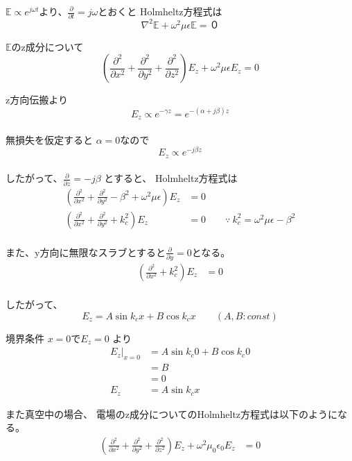 \documentclass[a4paper,10pt]{bxjsarticle}
\begin{document}
$\mathbb{E} \propto e^{j\omega t}$より、$\frac{\partial}{\partial t} = j\omega$とおくと
Holmheltz方程式は
$$
\nabla^2 \mathbb{E} + \omega^2 \mu \epsilon \mathbb{E} = ０
$$

$\mathbb{E}$のz成分について
$$
\left( 
    \frac{\partial^2}{\partial x^2} 
    + \frac{\partial^2}{\partial y^2} 
    + \frac{\partial^2}{\partial z^2} 
\right) E_z
+ \omega^2 \mu \epsilon E_z
= 0
$$

z方向伝搬より $$E_z \propto e^{-\gamma z} = e^{-(\alpha + j \beta)z}$$ \\
無損失を仮定すると $\alpha = 0$なので $$E_z \propto e^{ -j \beta z}$$ \\
したがって、$ \frac{\partial}{\partial z} = -j \beta $ とすると、
Holmheltz方程式は
\begin{align*} 
\left( 
    \frac{\partial^2}{\partial x^2} 
    + \frac{\partial^2}{\partial y^2} 
    - \beta^2 
    + \omega^2 \mu \epsilon
\right) E_z
&= 0 \\
\left( 
    \frac{\partial^2}{\partial x^2} 
    + \frac{\partial^2}{\partial y^2} 
    + k_c^2
\right) E_z
&= 0 \qquad
\because \ k_c^2 = \omega^2 \mu \epsilon - \beta^2 \\
\end{align*}

また、y方向に無限なスラブとすると$\frac{\partial}{\partial y} = 0$となる。
\begin{align*} 
    \left( 
        \frac{\partial^2}{\partial x^2} + k_c^2
    \right) E_z
    &= 0 \\
\end{align*}

したがって、
$$ E_z = A \sin k_c x + B \cos k_c x \qquad (A,B : const) $$

境界条件 $x = 0$で$E_z = 0$ より
\begin{align*}
    E_z|_{x=0} &= A \sin k_c 0 + B \cos k_c 0 \\
             &= B \\ 
             &= 0 \\
    E_z &= A \sin k_c x
\end{align*}

また真空中の場合、
電場のz成分についてのHolmheltz方程式は以下のようになる。
\begin{align*}
    \left( 
        \frac{\partial^2}{\partial x^2} 
        + \frac{\partial^2}{\partial y^2} 
        + \frac{\partial^2}{\partial z^2} 
    \right) E_z
    + \omega^2 \mu_0 \epsilon_0 E_z
    & = 0
\end{align*}
\end{document}
